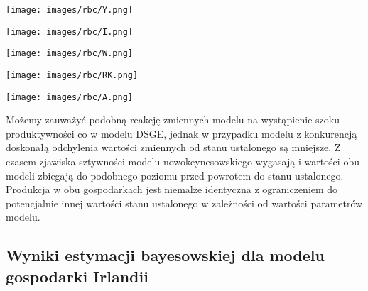 \begin{center}
    \begin{minipage}{.3\textwidth}
      \centering
      \captionsetup{type=figure}
      \texttt{[image: images/rbc/Y.png]}
      \label{fig:rbc:Y}
    \end{minipage}%
    \begin{minipage}{.3\textwidth}
      \centering
      \captionsetup{type=figure}
      \texttt{[image: images/rbc/I.png]}
      \label{fig:rbc:I}
    \end{minipage}
    \begin{minipage}{.3\textwidth}
      \centering
      \captionsetup{type=figure}
      \texttt{[image: images/rbc/W.png]}
      \label{fig:rbc:W}
    \end{minipage}
\end{center}

\begin{center}
    \begin{minipage}{.4\textwidth}
      \centering
      \captionsetup{type=figure}
      \texttt{[image: images/rbc/RK.png]}
      \label{fig:rbc:RK}
    \end{minipage}%
    \begin{minipage}{.4\textwidth}
      \centering
      \captionsetup{type=figure}
      \texttt{[image: images/rbc/A.png]}
      \label{fig:rbc:A}
    \end{minipage}
\end{center}
Możemy zauważyć podobną reakcję zmiennych modelu na wystąpienie szoku produktywności co w modelu DSGE, jednak w przypadku modelu z konkurencją doskonałą odchylenia wartości zmiennych od stanu ustalonego są mniejsze. Z czasem zjawiska sztywności modelu nowokeynesowskiego wygasają i wartości obu modeli zbiegają do podobnego poziomu przed powrotem do stanu ustalonego. Produkcja w obu gospodarkach jest niemalże identyczna z ograniczeniem do potencjalnie innej wartości stanu ustalonego w zależności od wartości parametrów modelu.

\subsection{Wyniki estymacji bayesowskiej dla modelu gospodarki Irlandii}

